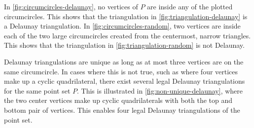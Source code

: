 In \autoref{fig:circumcircles-delaunay}, no vertices of $P$ are inside any of the plotted circumcircles. This shows that the triangulation in \autoref{fig:triangulation-delaunay} is a Delaunay triangulation. In \autoref{fig:circumcircles-random}, two vertices are inside each of the two large circumcircles created from the centermost, narrow triangles. This shows that the triangulation in \autoref{fig:triangulation-random} is not Delaunay.

Delaunay triangulations are unique as long as at most three vertices are on the same circumcircle. In cases where this is not true, such as where four vertices make up a cyclic quadrilateral, there exist several legal Delaunay triangulations for the same point set $P$. This is illustrated in \autoref{fig:non-unique-delaunay}, where the two center vertices make up cyclic quadrilaterals with both the top and bottom pair of vertices. This enables four legal Delaunay triangulations of the point set.

